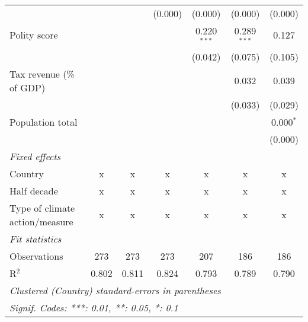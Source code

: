 \begin{tabular}{lcccccc}
                                                                                          &         &               & (0.000)        & (0.000)        & (0.000)        & (0.000)\\   
   Polity score                                                                           &         &               &                & 0.220$^{***}$  & 0.289$^{***}$  & 0.127\\   
                                                                                          &         &               &                & (0.042)        & (0.075)        & (0.105)\\   
   Tax revenue (\% of GDP)                                                                &         &               &                &                & 0.032          & 0.039\\   
                                                                                          &         &               &                &                & (0.033)        & (0.029)\\   
   Population total                                                                       &         &               &                &                &                & 0.000$^{*}$\\   
                                                                                          &         &               &                &                &                & (0.000)\\   
   \emph{Fixed effects}\\
   Country                                                                                & x       & x             & x              & x              & x              & x\\  
   Half decade                                                                            & x       & x             & x              & x              & x              & x\\  
   Type of climate action/measure                                                         & x       & x             & x              & x              & x              & x\\  
   \midrule \emph{Fit statistics}\\
   Observations                                                                           & 273     & 273           & 273            & 207            & 186            & 186\\  
   R$^2$                                                                                  & 0.802   & 0.811         & 0.824          & 0.793          & 0.789          & 0.790\\  
   \midrule
   \multicolumn{7}{l}{\emph{Clustered (Country) standard-errors in parentheses}}\\
   \multicolumn{7}{l}{\emph{Signif. Codes: ***: 0.01, **: 0.05, *: 0.1}}\\
\end{tabular}
\par\endgroup


